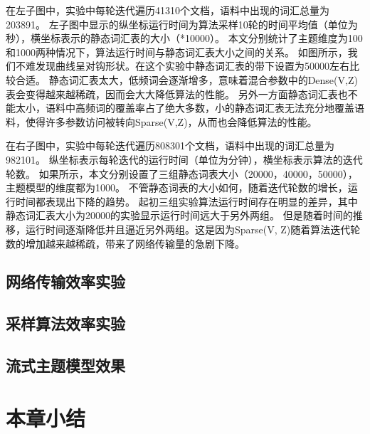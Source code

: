 在左子图中，实验中每轮迭代遍历41310个文档，语料中出现的词汇总量为203891。
左子图中显示的纵坐标运行时间为算法采样10轮的时间平均值（单位为秒），横坐标表示的静态词汇表的大小（*10000）。
本文分别统计了主题维度为100和1000两种情况下，算法运行时间与静态词汇表大小之间的关系。
如图所示，我们不难发现曲线呈对钩形状。在这个实验中静态词汇表的带下设置为50000左右比较合适。
静态词汇表太大，低频词会逐渐增多，意味着混合参数中的Dense(V,Z)表会变得越来越稀疏，因而会大大降低算法的性能。
另外一方面静态词汇表也不能太小，语料中高频词的覆盖率占了绝大多数，小的静态词汇表无法充分地覆盖语料，使得许多参数访问被转向Sparse(V,Z)，从而也会降低算法的性能。

在右子图中，实验中每轮迭代遍历808301个文档，语料中出现的词汇总量为982101。
纵坐标表示每轮迭代的运行时间（单位为分钟），横坐标表示算法的迭代轮数。
如果所示，本文分别设置了三组静态词表大小（20000，40000，50000），主题模型的维度都为1000。
不管静态词表的大小如何，随着迭代轮数的增长，运行时间都表现出下降的趋势。
起初三组实验算法运行时间存在明显的差异，其中静态词汇表大小为20000的实验显示运行时间远大于另外两组。
但是随着时间的推移，运行时间逐渐降低并且逼近另外两组。这是因为Sparse(V, Z)随着算法迭代轮数的增加越来越稀疏，带来了网络传输量的急剧下降。

\subsection{网络传输效率实验}

\subsection{采样算法效率实验}

\subsection{流式主题模型效果}

\section{本章小结}
